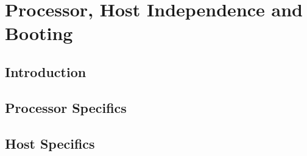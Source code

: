 \chapter{Processor, Host Independence and Booting}

\section{Introduction}

\section{Processor Specifics}

\section{Host Specifics}



